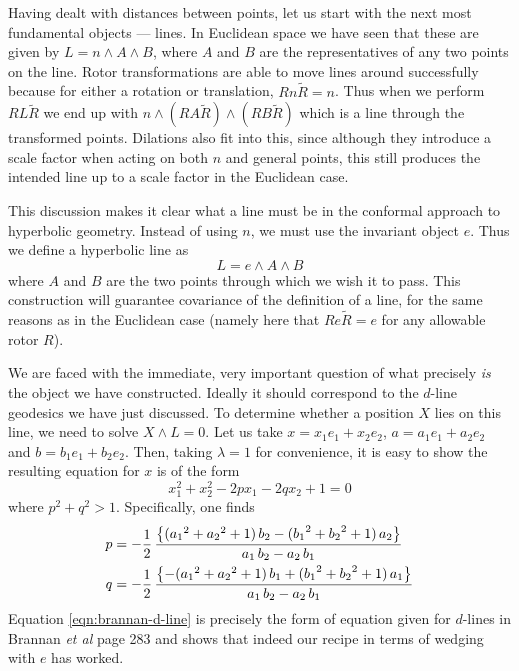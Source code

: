 Having dealt with distances between points, let us start with the
next most fundamental objects --- lines. In Euclidean space we
have seen that these are given by $L = n \wedge A \wedge B$, where $A$
and $B$ are the representatives of any two points on the line.
Rotor transformations are able to move lines around successfully
because for either a rotation or translation, $R n \tilde{R} = n$.
Thus when we perform $R L \tilde{R}$ we end up with $n \wedge (R A \tilde{R})
\wedge (R B \tilde{R})$ which is a line through the transformed points.
Dilations also fit into this, since although they introduce a
scale factor when acting on both $n$ and general points, this
still produces the intended line up to a scale factor in the
Euclidean case.

This discussion makes it clear what a line must be in the
conformal approach to hyperbolic geometry. Instead of
using $n$, we must use the invariant object $e$. Thus we
define a hyperbolic line as
%
\begin{equation}\label{eqn:line-def}
L = e \wedge A \wedge B
\end{equation}
%
where $A$ and $B$ are the two points through which we
wish it to pass. This construction will guarantee
covariance of the definition of a line, for the same
reasons as in the Euclidean case (namely here that $R e
\tilde{R} = e$ for any allowable rotor $R$).

We are faced with the immediate, very important question of
what precisely {\em is\/} the object we have constructed.
Ideally it should correspond to the $d$-line geodesics we
have just discussed. To determine whether a position $X$
lies on this line, we need to solve $X\wedge L=0$. Let us
take $x=x_1 e_1 + x_2 e_2$, $a=a_1 e_1 + a_2 e_2$ and
$b=b_1 e_1 + b_2 e_2$. Then, taking $\lambda=1$ for
convenience,  it is easy to show the resulting equation
for $x$ is of the form
%
\begin{equation}\label{eqn:brannan-d-line}
x_1^2+x_2^2-2 p x_1 -2 q x_2 +1 =0
\end{equation}
%
where $p^2+q^2>1$. Specifically, one finds
%
\begin{align}
p &= -\frac{1}{2}\,\frac {\left\{({a_1}^2+{a_2}^2
+1)\,b_2 - ({b_1}^2+{b_2}^2 +1)\,a_2\right\}}{ a_1\, b_2-
a_2\, b_1} \nn \\
%
q &= -\frac{1}{2}\,{\frac {\left\{-({a_1}^2+{a_2}^2
+1)\,b_1 + ({b_1}^2+{b_2}^2 +1)\,a_1\right\}}{{ a_1}\,{
b_2}-{ a_2}\,{ b_1}}} \nn
%
\end{align}
%
Equation \ref{eqn:brannan-d-line} is precisely the form
of equation given for $d$-lines in Brannan \emph{et al}\cite{GEOM:Brannan} 
page 283 and shows that
indeed our recipe in terms of wedging with $e$ has worked.


